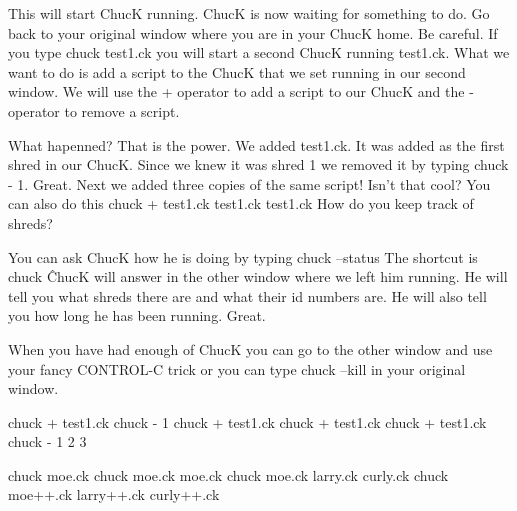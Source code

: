 This will start ChucK running. ChucK is now waiting for something to do. Go back to your original window where you are in your ChucK home. Be careful. If you type chuck test1.ck you will start a second ChucK running test1.ck. What we want to do is add a script to the ChucK that we set running in our second window. We will use the + operator to add a script to our ChucK and the - operator to remove a script. 

What hapenned? That is the power. We added test1.ck. It was added as the first shred in our ChucK. Since we knew it was shred 1 we removed it by typing chuck - 1. Great. Next we added three copies of the same script! Isn't that cool? You can also do this chuck + test1.ck test1.ck test1.ck How do you keep track of shreds? 

You can ask ChucK how he is doing by typing chuck --status The shortcut is chuck \^ ChucK will answer in the other window where we left him running. He will tell you what shreds there are and what their id numbers are. He will also tell you how long he has been running. Great. 

When you have had enough of ChucK you can go to the other window and use your fancy CONTROL-C trick or you can type chuck --kill in your original window.   


 chuck + test1.ck    chuck - 1     chuck + test1.ck    chuck + test1.ck    chuck + test1.ck    chuck - 1 2 3

chuck moe.ck    chuck moe.ck moe.ck    chuck moe.ck larry.ck curly.ck    chuck moe++.ck larry++.ck curly++.ck